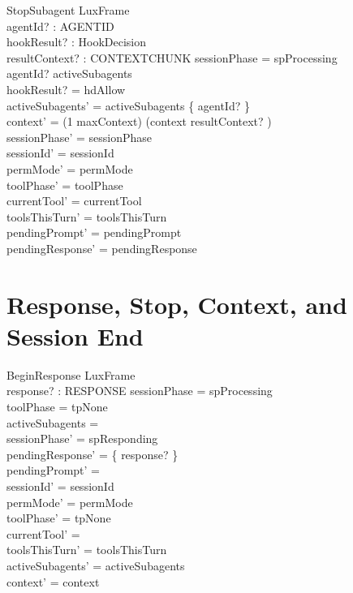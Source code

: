 \documentclass[a4paper,10pt,fleqn]{article}
\begin{document}
\begin{schema}{StopSubagent}
  LuxFrame \\
  agentId? : AGENTID \\
  hookResult? : HookDecision \\
  resultContext? : CONTEXTCHUNK
  \where
  sessionPhase = spProcessing \\
  agentId? \in activeSubagents \\
  hookResult? = hdAllow \\
  activeSubagents' = activeSubagents \setminus \{ agentId? \} \\
  context' = (1 \upto maxContext) \dres (context \cat \langle resultContext? \rangle) \\
  sessionPhase' = sessionPhase \\
  sessionId' = sessionId \\
  permMode' = permMode \\
  toolPhase' = toolPhase \\
  currentTool' = currentTool \\
  toolsThisTurn' = toolsThisTurn \\
  pendingPrompt' = pendingPrompt \\
  pendingResponse' = pendingResponse
\end{schema}

\section{Response, Stop, Context, and Session End}

\begin{schema}{BeginResponse}
  LuxFrame \\
  response? : RESPONSE
  \where
  sessionPhase = spProcessing \\
  toolPhase = tpNone \\
  activeSubagents = \emptyset \\
  sessionPhase' = spResponding \\
  pendingResponse' = \{ response? \} \\
  pendingPrompt' = \emptyset \\
  sessionId' = sessionId \\
  permMode' = permMode \\
  toolPhase' = tpNone \\
  currentTool' = \emptyset \\
  toolsThisTurn' = toolsThisTurn \\
  activeSubagents' = activeSubagents \\
  context' = context
\end{schema}
\end{document}
